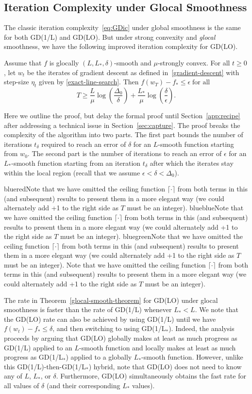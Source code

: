 \documentclass[10pt]{article} %
\newif\ifshowcolours
\def\red{red}
\def\blue{blue}
\def\green{green}
\renewcommand{\textcolor}[2]{%
  \ifshowcolours
    {\color{#1}#2}%
  \else
    \def\temp{#1}%
    \ifx\temp\red     #2\else
    \ifx\temp\blue    #2\else
    \ifx\temp\green   #2\else
        {\color{#1}#2}%
    \fi\fi\fi
  \fi
}
\begin{document}
\subsection{Iteration Complexity under Glocal Smoothness}

The classic iteration complexity~\eqref{eq:GDic} under global smoothness is the same for both GD(1/L) and GD(LO). 
But under strong convexity and \emph{glocal} smoothness, we have the following improved iteration complexity for GD(LO).
\begin{theorem}
    \label{glocal-smooth-theorem}
    Assume that $f$ is glocally $(L, L_*, \delta)$-smooth and $\mu$-strongly convex. For all $t \geq 0$, let $w_t$ be the iterates of gradient descent as defined in~\eqref{gradient-descent} with step-size $\eta_t$ given by \eqref{exact-line-search}. Then $f(w_T) - f_* \leq \epsilon \;\text{for all}$
    \begin{equation*}
        T \geq
        \frac{L}{\mu}\log\left(\frac{\Delta_{0}}{\delta}\right) + \frac{L_*}{\mu}\log\left(\frac{\delta}{\epsilon}\right).
    \end{equation*}
\end{theorem}
Here we outline the proof, but delay the formal proof until Section~\ref{app:recipe} after addressing a technical issue in Section~\ref{sec:capture}. The proof breaks the complexity of the algorithm into two parts. The first part bounds the number of iterations $t_\delta$ required to reach an error of $\delta$ for an $L$-smooth function starting from $w_0$. The second part is the number of iterations to reach an error of $\epsilon$ for an $L_*$-smooth function starting from an iteration $t_\delta$ after which the iterates stay within the local region (recall that we assume $\epsilon < \delta < \Delta_0$). \textcolor{blue}{Note that we have omitted the ceiling function $\lceil \cdot \rceil$ from both terms in this (and subsequent) results to present them in a more elegant way (we could alternately add +1 to the right side as $T$ must be an integer).}

The rate in Theorem~\ref{glocal-smooth-theorem} for GD(LO) under glocal smoothness is faster than the rate of GD(1/L) whenever $L_* < L$. We note that the GD(LO) rate can also be achieved by using GD(1/L) until we have $f(w_t)-f_* \leq \delta$, and then switching to using GD(1/L$_*$). Indeed, the analysis proceeds by arguing that GD(LO) globally makes at least as much progress as GD(1/L) applied to an $L$-smooth function and locally makes at least as much progress as GD(1/L$_*$) applied to a globally $L_*$-smooth function. However, unlike this GD(1/L)-then-GD(1/L$_*$) hybrid, note that GD(LO) does not need to know any of $L$, $L_*$, or $\delta$. Furthermore, GD(LO) simultaneously obtains the fast rate for all values of $\delta$ (and their corresponding $L_*$ values). 
\end{document}
